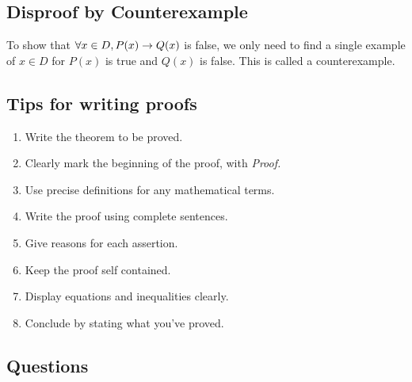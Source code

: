 \documentclass{report}
\begin{document}

\subsection*{Disproof by Counterexample}
To show that $\forall x\in D, P(x)\rightarrow Q(x)$ is false, we only need to find a single example of $x\in D$ for $P(x)$ is true and $Q(x)$ is false. This is called a counterexample.

\subsection*{Tips for writing proofs}
\begin{enumerate}
	\item Write the theorem to be proved.
	\item Clearly mark the beginning of the proof, with \textit{Proof.}
	\item Use precise definitions for any mathematical terms.
	\item Write the proof using complete sentences.
	\item Give reasons for each assertion.
	\item Keep the proof self contained.
	\item Display equations and inequalities clearly.
	\item Conclude by stating what you've proved.
\end{enumerate}

\subsection*{Questions}
\end{document}
